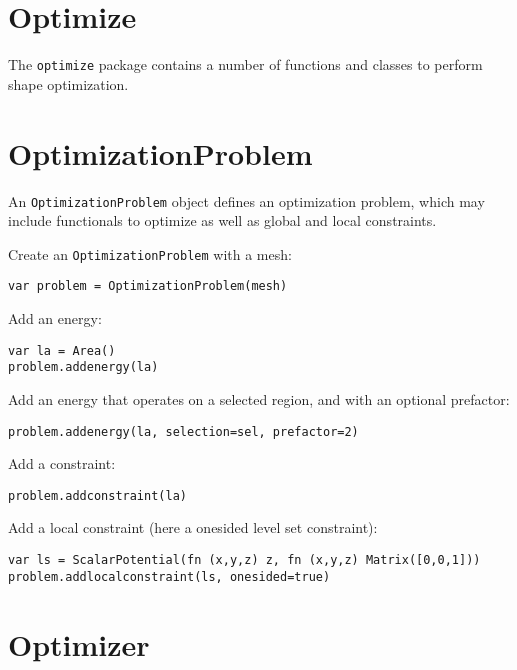 \hypertarget{optimize}{%
\section{Optimize}\label{optimize}}

The \texttt{optimize} package contains a number of functions and classes
to perform shape optimization.

\hypertarget{optimizationproblem}{%
\section{OptimizationProblem}\label{optimizationproblem}}

An \texttt{OptimizationProblem} object defines an optimization problem,
which may include functionals to optimize as well as global and local
constraints.

Create an \texttt{OptimizationProblem} with a mesh:

\begin{lstlisting}
var problem = OptimizationProblem(mesh)
\end{lstlisting}

Add an energy:

\begin{lstlisting}
var la = Area()
problem.addenergy(la)
\end{lstlisting}

Add an energy that operates on a selected region, and with an optional
prefactor:

\begin{lstlisting}
problem.addenergy(la, selection=sel, prefactor=2)
\end{lstlisting}

Add a constraint:

\begin{lstlisting}
problem.addconstraint(la)
\end{lstlisting}

Add a local constraint (here a onesided level set constraint):

\begin{lstlisting}
var ls = ScalarPotential(fn (x,y,z) z, fn (x,y,z) Matrix([0,0,1]))
problem.addlocalconstraint(ls, onesided=true)
\end{lstlisting}

\hypertarget{optimizer}{%
\section{Optimizer}\label{optimizer}}

